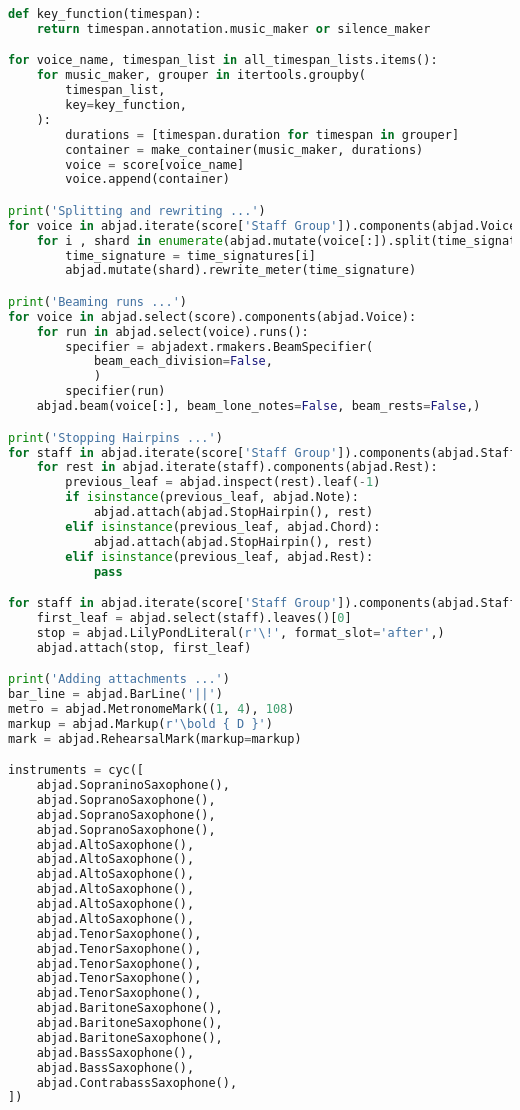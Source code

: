 \begin{lstlisting}[language=Python, caption=Invocation Source Code]
def key_function(timespan):
    return timespan.annotation.music_maker or silence_maker

for voice_name, timespan_list in all_timespan_lists.items():
    for music_maker, grouper in itertools.groupby(
        timespan_list,
        key=key_function,
    ):
        durations = [timespan.duration for timespan in grouper]
        container = make_container(music_maker, durations)
        voice = score[voice_name]
        voice.append(container)

print('Splitting and rewriting ...')
for voice in abjad.iterate(score['Staff Group']).components(abjad.Voice):
    for i , shard in enumerate(abjad.mutate(voice[:]).split(time_signatures)):
        time_signature = time_signatures[i]
        abjad.mutate(shard).rewrite_meter(time_signature)

print('Beaming runs ...')
for voice in abjad.select(score).components(abjad.Voice):
    for run in abjad.select(voice).runs():
        specifier = abjadext.rmakers.BeamSpecifier(
            beam_each_division=False,
            )
        specifier(run)
    abjad.beam(voice[:], beam_lone_notes=False, beam_rests=False,)

print('Stopping Hairpins ...')
for staff in abjad.iterate(score['Staff Group']).components(abjad.Staff):
    for rest in abjad.iterate(staff).components(abjad.Rest):
        previous_leaf = abjad.inspect(rest).leaf(-1)
        if isinstance(previous_leaf, abjad.Note):
            abjad.attach(abjad.StopHairpin(), rest)
        elif isinstance(previous_leaf, abjad.Chord):
            abjad.attach(abjad.StopHairpin(), rest)
        elif isinstance(previous_leaf, abjad.Rest):
            pass

for staff in abjad.iterate(score['Staff Group']).components(abjad.Staff):
    first_leaf = abjad.select(staff).leaves()[0]
    stop = abjad.LilyPondLiteral(r'\!', format_slot='after',)
    abjad.attach(stop, first_leaf)

print('Adding attachments ...')
bar_line = abjad.BarLine('||')
metro = abjad.MetronomeMark((1, 4), 108)
markup = abjad.Markup(r'\bold { D }')
mark = abjad.RehearsalMark(markup=markup)

instruments = cyc([
    abjad.SopraninoSaxophone(),
    abjad.SopranoSaxophone(),
    abjad.SopranoSaxophone(),
    abjad.SopranoSaxophone(),
    abjad.AltoSaxophone(),
    abjad.AltoSaxophone(),
    abjad.AltoSaxophone(),
    abjad.AltoSaxophone(),
    abjad.AltoSaxophone(),
    abjad.AltoSaxophone(),
    abjad.TenorSaxophone(),
    abjad.TenorSaxophone(),
    abjad.TenorSaxophone(),
    abjad.TenorSaxophone(),
    abjad.TenorSaxophone(),
    abjad.BaritoneSaxophone(),
    abjad.BaritoneSaxophone(),
    abjad.BaritoneSaxophone(),
    abjad.BassSaxophone(),
    abjad.BassSaxophone(),
    abjad.ContrabassSaxophone(),
])


\end{lstlisting}
